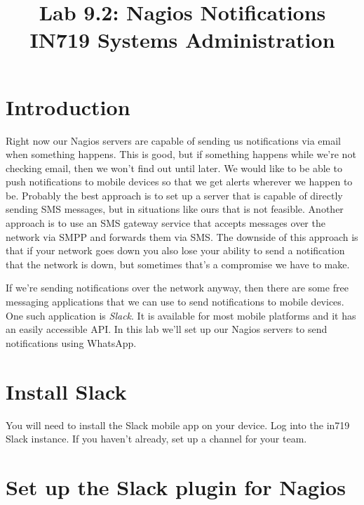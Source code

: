 \documentclass{article}   	%
\title{Lab 9.2:  Nagios Notifications\\ IN719 Systems Administration}
\date{}							%
\begin{document}
\maketitle

\section*{Introduction}
Right now our Nagios servers are capable of sending us notifications via email when something happens.  This is good, but if something happens while we're not checking email, then we won't find out until later.  We would like to be able to push notifications to mobile devices so that we get alerts wherever we happen to be.  Probably the best approach is to set up a server that is capable of directly sending SMS messages, but in situations like ours that is not feasible.  Another approach is to use an SMS gateway service that accepts messages over the network via SMPP and forwards them via SMS.  The downside of this approach is that if your network goes down you also lose your ability to send a notification that the network is down, but sometimes that's a compromise we have to make.

If we're sending notifications over the network anyway, then there are some free messaging applications that we can use to send notifications to mobile devices.  One such application is \emph{Slack}.  It is available for most mobile platforms and it has an easily accessible API.  In this lab we'll set up our Nagios servers to send notifications using WhatsApp.

\section{Install Slack}
You will need to install the Slack mobile app on your device.  Log into the in719 Slack instance. If you haven't already, set up a channel for your team.

\section{Set up the Slack plugin for Nagios}
\end{document}
